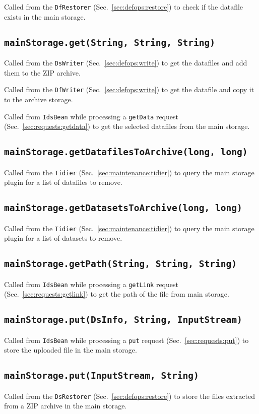 \documentclass[paper=a4]{scrartcl}
\begin{document}
Called from the \texttt{DfRestorer} (Sec.~\ref{sec:defops:restore}) to
check if the datafile exists in the main storage.

\subsection{\texttt{mainStorage.get(String, String, String)}}

Called from the \texttt{DsWriter} (Sec.~\ref{sec:defops:write}) to
get the datafiles and add them to the ZIP archive.

Called from the \texttt{DfWriter} (Sec.~\ref{sec:defops:write}) to
get the datafile and copy it to the archive storage.

Called from \texttt{IdsBean} while processing a \texttt{getData}
request (Sec.~\ref{sec:requests:getdata}) to get the selected
datafiles from the main storage.

\subsection{\texttt{mainStorage.getDatafilesToArchive(long, long)}}

Called from the \texttt{Tidier} (Sec.~\ref{sec:maintenance:tidier}) to
query the main storage plugin for a list of datafiles to remove.

\subsection{\texttt{mainStorage.getDatasetsToArchive(long, long)}}

Called from the \texttt{Tidier} (Sec.~\ref{sec:maintenance:tidier}) to
query the main storage plugin for a list of datasets to remove.

\subsection{\texttt{mainStorage.getPath(String, String, String)}}

Called from \texttt{IdsBean} while processing a \texttt{getLink}
request (Sec.~\ref{sec:requests:getlink}) to get the path of the file
from main storage.

\subsection{\texttt{mainStorage.put(DsInfo, String, InputStream)}}

Called from \texttt{IdsBean} while processing a \texttt{put} request
(Sec.~\ref{sec:requests:put}) to store the uploaded file in the main
storage.

\subsection{\texttt{mainStorage.put(InputStream, String)}}

Called from the \texttt{DsRestorer} (Sec.~\ref{sec:defops:restore})
to store the files extracted from a ZIP archive in the main storage.
\end{document}
